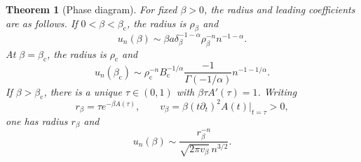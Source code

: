 \documentclass[11pt,a4paper]{article}
\numberwithin{equation}{section}
\newtheorem{theorem}{Theorem}[section]
\theoremstyle{definition}
\theoremstyle{remark}
\newcommand{\bc}{\beta_{\mathrm c}}
\newcommand{\rhoc}{\rho_{\mathrm c}}
\newcommand{\Bc}{B_{\mathrm c}}
\begin{document}
\begin{theorem}[Phase diagram]
\label{thm:phases}
For fixed $\beta>0$, the radius and leading coefficients are as follows.
If $0<\beta<\bc$, the radius is $\rho_\beta$ and
\begin{equation}\label{eq:subcritical}
 u_n(\beta)\sim\beta a\delta_\beta^{-1-\alpha}
                    \rho_\beta^{-n}n^{-1-\alpha}.
\end{equation}
At $\beta=\bc$, the radius is $\rhoc$ and
\begin{equation}\label{eq:critical-leading}
 u_n(\bc)\sim\rhoc^{-n}\Bc^{-1/\alpha}
               \frac{-1}{\Gamma(-1/\alpha)}n^{-1-1/\alpha}.
\end{equation}
If $\beta>\bc$, there is a unique $\tau\in(0,1)$ with
$\beta\tau A'(\tau)=1$. Writing
\begin{equation}\label{eq:fold-parameters}
 r_\beta=\tau e^{-\beta A(\tau)},\qquad
 v_\beta=\beta(t\partial_t)^2A(t)\big|_{t=\tau}>0,
\end{equation}
one has radius $r_\beta$ and
\begin{equation}\label{eq:supercritical}
 u_n(\beta)\sim\frac{r_\beta^{-n}}{\sqrt{2\pi v_\beta}\,n^{3/2}}.
\end{equation}
\end{theorem}
\end{document}
